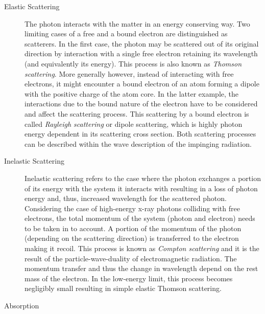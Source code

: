 \begin{description}
       \item[Elastic Scattering]
          {The photon interacts with the matter in an energy conserving way. Two limiting cases of a free and a bound electron are distinguished as scatterers. In the first case, the photon may be scattered out of its original direction by interaction with a single free electron retaining its wavelength (and equivalently its energy). This process is also known as \emph{Thomson scattering}. More generally however, instead of interacting with free electrons, it might encounter a bound electron of an atom forming a dipole with the positive charge of the atom core. In the latter example, the interactions due to the bound nature of the electron have to be considered and affect the scattering process. This scattering by a bound electron is called \emph{Rayleigh scattering} or dipole scattering, which is highly photon energy dependent in its scattering cross section. Both scattering processes can be described within the wave description of the impinging radiation.}
       \item[Inelastic Scattering]
          {Inelastic scattering refers to the case where the photon exchanges a portion of its energy with the system it interacts with resulting in a loss of photon energy and, thus, increased wavelength for the scattered photon. Considering the case of high-energy x-ray photons colliding with free electrons, the total momentum of the system (photon and electron) needs to be taken in to account. A portion of the momentum of the photon (depending on the scattering direction) is transferred to the electron making it recoil. This process is known as \emph{Compton scattering} and it is the result of the particle-wave-duality of electromagnetic radiation. The momentum transfer and thus the change in wavelength depend on the rest mass of the electron. In the low-energy limit, this process becomes negligibly small resulting in simple elastic Thomson scattering.}      %
       \item[Absorption]

\end{description}
